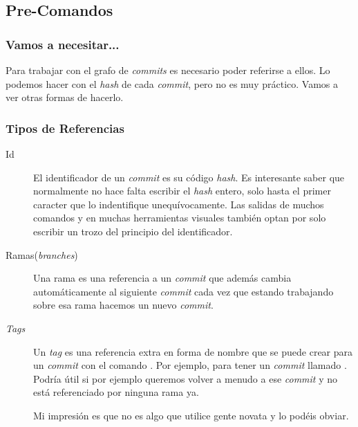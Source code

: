 \subsection{Pre-Comandos}

\begin{frame}\frametitle{Vamos a necesitar...}
Para trabajar con el grafo de \textit{commits} es necesario poder referirse a ellos.
Lo podemos hacer con el \textit{hash} de cada \textit{commit},
pero no es muy práctico.
Vamos a ver otras formas de hacerlo.
\end{frame}

\begin{frame}\frametitle{Tipos de Referencias}
\small
\begin{description}
    \item[Id] El identificador de un \textit{commit} es su código \textit{hash}.
    Es interesante saber que normalmente
    no hace falta escribir el \textit{hash} entero,
    solo hasta el primer caracter que lo indentifique unequívocamente.
    Las salidas de muchos comandos y en muchas herramientas visuales también
    optan por solo escribir un trozo del principio del identificador.
    
    \item[Ramas(\textit{branches})] Una rama es una referencia a un \textit{commit}
    que además cambia automáticamente al siguiente \textit{commit} cada vez que
    estando trabajando sobre esa rama hacemos un nuevo \textit{commit}.
    \hyperlink{fr:graph-example}{}
    
    \item[\textit{Tags}] Un \textit{tag} es una referencia extra en forma de nombre
    que se puede crear para un \textit{commit} con el comando .
    Por ejemplo, para tener un \textit{commit} llamado .
    Podría útil si por ejemplo queremos volver a menudo a ese \textit{commit}
    y no está referenciado por ninguna rama ya.

    Mi impresión es que no es algo que utilice gente novata y lo podéis obviar.
\end{description}
\end{frame}

